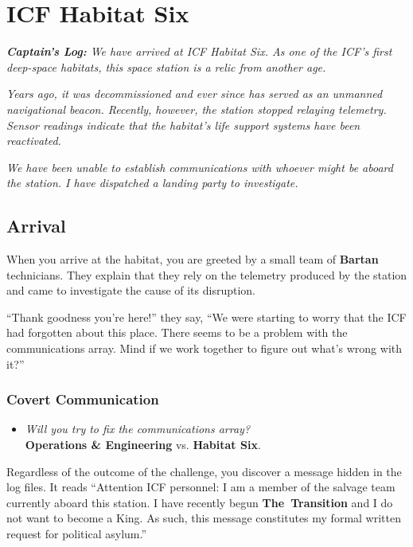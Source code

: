 \documentclass[11pt, a5paper, parskip=half-, DIV=12]{scrartcl}
\begin{document}
\newpage

\ClearShipoutPicture
{}

\section*{ICF Habitat Six}
\textit{\textbf{Captain's Log:} We have arrived at ICF Habitat Six. As one of the ICF's first deep-space habitats, this space station is a relic from another age.}

\textit{Years ago, it was decommissioned and ever since has served as an unmanned navigational beacon. Recently, however, the station stopped relaying telemetry. Sensor readings indicate that the habitat's life support systems have been reactivated.}

\textit{We have been unable to establish communications with whoever might be aboard the station. I have dispatched a landing party to investigate.}

\subsection*{Arrival}
When you arrive at the habitat, you are greeted by a small team of \textbf{Bartan} technicians. They explain that they rely on the telemetry produced by the station and came to investigate the cause of its disruption.

``Thank goodness you're here!'' they say, ``We were starting to worry that the ICF had forgotten about this place. There seems to be a problem with the communications array. Mind if we work together to figure out what's wrong with it?''

\subsubsection*{Covert Communication}
\begin{itemize}[topsep=0ex, partopsep=0ex]
	\item \textit{Will you try to fix the communications array?}\\ \textbf{Operations \& Engineering} vs. \textbf{Habitat Six}.
\end{itemize}
Regardless of the outcome of the challenge, you discover a message hidden in the log files. It reads ``Attention ICF personnel: I am a member of the salvage team currently aboard this station. I have recently begun \textbf{The~Transition} and I do not want to become a King. As such, this message constitutes my formal written request for political asylum.''
\end{document}

